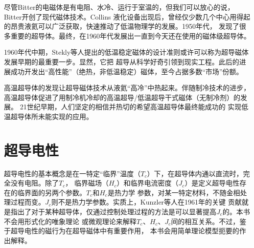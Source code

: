 \begin{table}[htbp]
\end{table}

尽管Bitter的电磁体是有电阻、水冷、运行于室温的，但我们可以放心的说，Bitter开创了现代磁体技术。Collins
液化设备出现后，曾经仅少数几个中心用得起的昂贵液氦可以广泛获取，快速推动了低温物理学的发展。1950年代，
发现了很多重要的超导体。最终，在1960年代发展出一直到今天还在使用的磁体级超导体。

1960年代中期，Stekly等人提出的低温稳定磁体的设计准则或许可以称为超导磁体发展早期的最重要一步。显然，它把
超导从科学好奇引领到现实工程。此后的进展成功开发出“高性能”（绝热，非低温稳定）磁体，至今占据多数“市场”份额。

高温超导体的发现让超导磁体技术从液氦“高冷”中热起来。伴随制冷技术的进步，高温超导体促进了用制冷机冷却的高温超导/低温超导干式磁体（无制冷剂）的发展。
21世纪早期，人们坚定的相信并热切的希望高温超导体最终能成功的
实现低温超导体所未能实现的应用。

\section{超导电性}
超导电性的基本概念是在一特定“临界”温度（$T_c$）下，在超导体内通以直流时，完全没有电阻。除了$T_c$，
临界磁场（$H_c$）和临界电流密度（$J_c$）是定义超导电性存在的临界面的另两个参数。$T_c$和$H_c$是热力学
参数，对某一特定材料，不随金相处理过程而变。$J_c$则不是热力学参数。实质上，Kunzler等人在1961年的关键
贡献就是指出了对于某种超导体，仅通过控制处理过程的方法是可以显著提高$J_c$的。本书不会用形式化的唯象理论
或微观理论来解释$T_c$、$H_c$、$J_c$间的相互关系。不过，鉴于超导电性的磁行为在超导磁体中有重要作用，
本书会用简单理论模型扼要的作出解释。

